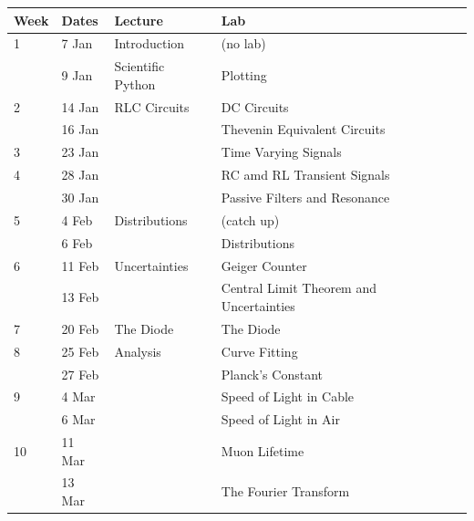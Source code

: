 \documentclass[12pt]{article}
\begin{document}
\begin{table}[h!]
\normalsize %
\begin{tabular}{ lllll }
\hline
\textbf{Week} & \textbf{Dates} & \textbf{Lecture} & \textbf{Lab} \\
\hline
1 & 7 Jan & Introduction & (no lab) \\
   & 9 Jan & Scientific Python & Plotting\\
\hline
2 & 14 Jan & RLC Circuits & DC Circuits \\
  & 16 Jan & & Thevenin Equivalent Circuits \\
\hline
3 & 23 Jan & & Time Varying Signals \\
\hline
4 & 28 Jan & & RC amd RL Transient Signals \\
   & 30 Jan &  &  Passive Filters and Resonance \\
\hline
5 & 4 Feb & Distributions & (catch up) \\
   & 6 Feb & & Distributions \\
\hline
6 & 11 Feb & Uncertainties & Geiger Counter \\
   & 13 Feb & & Central Limit Theorem and Uncertainties \\
\hline
7 & 20 Feb & The Diode & The Diode\\
\hline
8 & 25 Feb & Analysis & Curve Fitting \\
   & 27 Feb & & Planck's Constant \\
\hline
9 & 4 Mar & & Speed of Light in Cable \\
   & 6 Mar & & Speed of Light in Air \\
\hline
10 & 11 Mar & & Muon Lifetime\\
   & 13 Mar & & The Fourier Transform\\
\hline
\end{tabular} 
\end{table}
\end{document}
